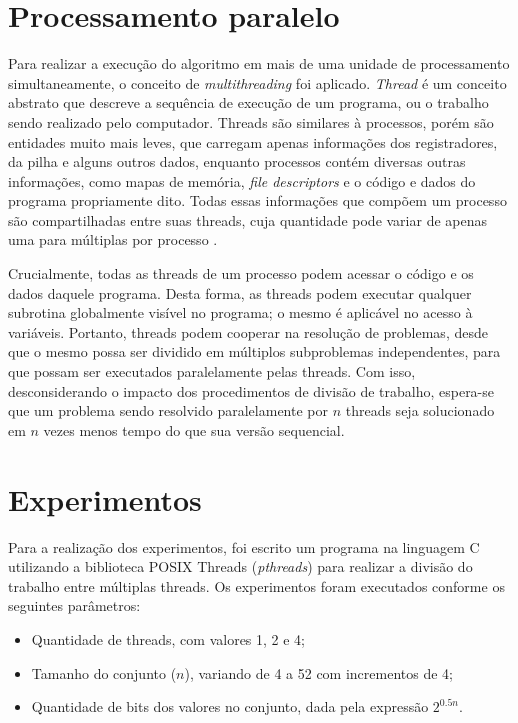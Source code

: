 \documentclass[12pt]{article}
\begin{document}
\section{Processamento paralelo} \label{sec:parallel}

Para realizar a execução do algoritmo em mais de uma unidade de processamento simultaneamente, o conceito de \textit{multithreading} foi aplicado. \textit{Thread} é um conceito abstrato que descreve a sequência de execução de um programa, ou o trabalho sendo realizado pelo computador. Threads são similares à processos, porém são entidades muito mais leves, que carregam apenas informações dos registradores, da pilha e alguns outros dados, enquanto processos contém diversas outras informações, como mapas de memória, \textit{file descriptors} e o código e dados do programa propriamente dito. Todas essas informações que compõem um processo são compartilhadas entre suas threads, cuja quantidade pode variar de apenas uma para múltiplas por processo \cite{Lewis1996}.

Crucialmente, todas as threads de um processo podem acessar o código e os dados daquele programa. Desta forma, as threads podem executar qualquer subrotina globalmente visível no programa; o mesmo é aplicável no acesso à variáveis. Portanto, threads podem cooperar na resolução de problemas, desde que o mesmo possa ser dividido em múltiplos subproblemas independentes, para que possam ser executados paralelamente pelas threads. Com isso, desconsiderando o impacto dos procedimentos de divisão de trabalho, espera-se que um problema sendo resolvido paralelamente por $n$ threads seja solucionado em $n$ vezes menos tempo do que sua versão sequencial.

\section{Experimentos} \label{sec:experiments}

Para a realização dos experimentos, foi escrito um programa  na linguagem C utilizando a biblioteca POSIX Threads (\textit{pthreads}) para realizar a divisão do trabalho entre múltiplas threads. Os experimentos foram executados conforme os seguintes parâmetros:

\begin{itemize}
    \item Quantidade de threads, com valores 1, 2 e 4;
    \item Tamanho do conjunto ($n$), variando de 4 a 52 com incrementos de 4;
    \item Quantidade de bits dos valores no conjunto, dada pela expressão $2^{0.5n}$.
\end{itemize}
\end{document}

